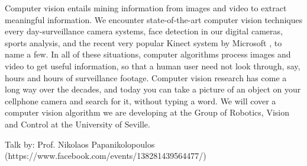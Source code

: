 Computer vision entails mining information from images and video to extract meaningful information. We encounter state-of-the-art computer vision techniques every day-surveillance camera systems, face detection in our digital cameras, sports analysis, and the recent very popular Kinect system by Microsoft \cite{Kinect_intro}, to name a few. In all of these situations, computer algorithms process images and video to get useful information, so that a human user need not look through, say, hours and hours of surveillance footage. Computer vision research has come a long way over the decades, and today you can take a picture of an object on your cellphone camera and search for it, without typing a word. We will cover a computer vision algorithm we are developing at the Group of Robotics, Vision and Control at the University of Seville.

Talk by: Prof. Nikolaos Papanikolopoulos (https://www.facebook.com/events/138281439564477/)


